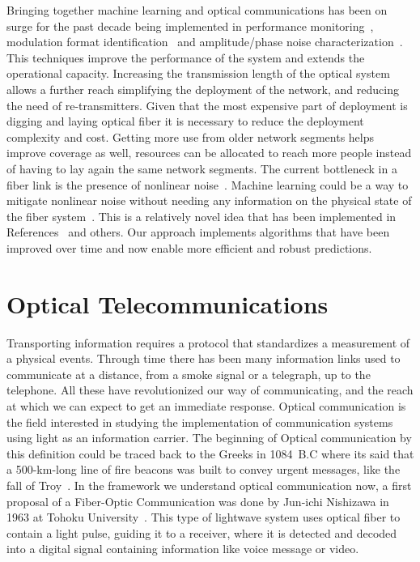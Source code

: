Bringing together machine learning and optical communications has been on surge for the past decade being implemented in performance monitoring~\cite{shen2010optical,jargon2008optical}, modulation format identification~\cite{khan2012modulation} and amplitude/phase noise characterization~\cite{zibar2015application}. This techniques improve the performance of the system and extends the operational capacity. Increasing the transmission length of the optical system allows a further reach simplifying the deployment of the network, and reducing the need of re-transmitters. Given that the most expensive part of deployment is digging and laying optical fiber it is necessary to reduce the deployment complexity and cost. Getting more use from older network segments helps improve coverage as well, resources can be allocated to reach more people instead of having to lay again the same network segments. The current bottleneck in a fiber link is the presence of nonlinear noise~\cite{NLPNDSP}. Machine learning could be a way to mitigate nonlinear noise without needing any information on the physical state of the fiber system~\cite{Nonparameter}. This is a relatively novel idea that has been implemented in References~\cite{Nonparameter,zibar2015application} and others. Our approach implements algorithms that have been improved over time and now enable more efficient and robust predictions.  






 



\section{Optical Telecommunications}

Transporting information requires a protocol that standardizes a measurement of a physical events. Through time there has been many information links used to communicate at a distance, from a smoke signal or a telegraph, up to the telephone. All these have revolutionized our way of communicating, and the reach at which we can expect to get an immediate response. Optical communication is the field interested in studying the implementation of communication systems using light as an information carrier. The beginning of Optical communication by this definition could be traced back to the Greeks in 1084~B.C where its said that a 500-km-long line of fire beacons was built to convey urgent messages, like the fall of Troy~\cite{HistoryCommunication}. In the framework we understand optical communication now, a first proposal of a Fiber-Optic Communication was done by Jun-ichi Nishizawa in 1963 at Tohoku University~\cite{ProposeFiberCom}. This type of lightwave system uses optical fiber to contain a light pulse, guiding it to a receiver, where it is detected  and decoded into a digital signal containing information like voice message or video.

